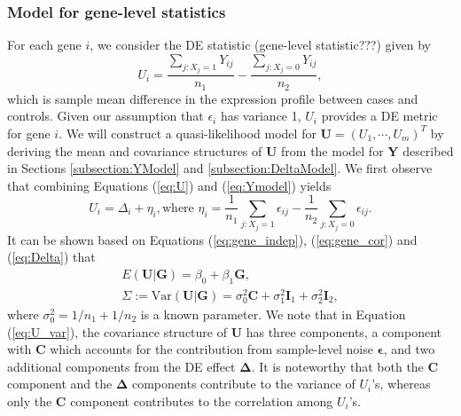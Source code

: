 \documentclass[a4,center,fleqn]{NAR}
\begin{document}
	\subsubsection{Model for gene-level statistics}\label{subsection:UModel}
	For each gene $i$, we consider the DE statistic (gene-level statistic???) given by 
	\begin{equation}
	\label{eq:U}
	U_i = \dfrac{\sum_{j: X_j=1}Y_{ij}}{n_1} - \dfrac{\sum_{j: X_j=0}Y_{ij}}{n_2},
	\end{equation}
	which is sample mean difference in the expression profile between cases and controls. Given our
	assumption that $\epsilon_i$ has variance 1, $U_i$ provides a DE metric for gene $i$. We will
	construct a quasi-likelihood model for $\bm U=(U_1,\cdots,U_m)^T$ by deriving the mean and
	covariance structures of $\bm U$ from the model for $\bm Y$ described in Sections
	\ref{subsection:YModel} and \ref{subsection:DeltaModel}. We first observe that combining Equations
	(\ref{eq:U}) and (\ref{eq:Ymodel}) yields
	\begin{equation} 
	U_i = \Delta_i + \eta_i, \text{where } \eta_i = \dfrac{1}{n_1}\sum_{j: X_j=1}\epsilon_{ij}-
	\dfrac{1}{n_2}\sum_{j: X_j=0}\epsilon_{ij}.
	\end{equation}
	It can be shown based on Equations (\ref{eq:gene_indep}), (\ref{eq:gene_cor}) and (\ref{eq:Delta})
	that
	\begin{gather}
	E(\bm U|\bm G) = \beta_0+\beta_1 \bm G,\label{eq:U_mean}\\
	\Sigma:=\mbox{Var}(\bm U|\bm G) = \sigma_0^2\bm C + \sigma_1^2\bm I_1+\sigma_2^2\bm
	I_2,\label{eq:U_var}
	\end{gather}
	where $\sigma_0^2=1/n_1+1/n_2$ is a known parameter. We note that in Equation (\ref{eq:U_var}), the
	covariance structure of $\bm U$ has three components, a component with $\bm C$ which accounts for
	the contribution from sample-level noise $\bm \epsilon$, and two additional components from the DE
	effect $\bm \Delta$. It is noteworthy that both the $\bm C$ component and the $\bm \Delta$
	components contribute to the variance of $U_i$'s, whereas only the $\bm C$ component contributes to
	the correlation among $U_i$'s.
	
\end{document}
